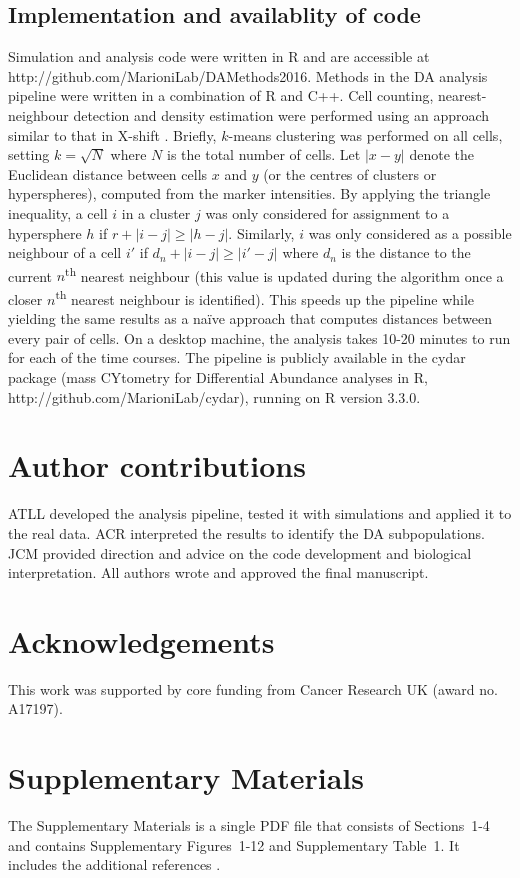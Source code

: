 \documentclass{article}
\newcommand{\suppannotate}{4}
\newcommand{\suppfigclusterreal}{12}
\begin{document}
\subsection{Implementation and availablity of code}
Simulation and analysis code were written in R and are accessible at {http://\-github.com/\-MarioniLab/\-DAMethods2016}.
Methods in the DA analysis pipeline were written in a combination of R and C++.
Cell counting, nearest-neighbour detection and density estimation were performed using an approach similar to that in X-shift \cite{samusik2016automated}.
Briefly, $k$-means clustering was performed on all cells, setting $k=\sqrt{N}$ where $N$ is the total number of cells.
Let $|x-y|$ denote the Euclidean distance between cells $x$ and $y$ (or the centres of clusters or hyperspheres), computed from the marker intensities.
By applying the triangle inequality, a cell $i$ in a cluster $j$ was only considered for assignment to a hypersphere $h$ if $r + |i-j| \ge |h-j|$.
Similarly, $i$ was only considered as a possible neighbour of a cell $i'$ if $d_n + |i-j| \ge |i'-j|$ where $d_n$ is the distance to the current $n$\textsuperscript{th} nearest neighbour (this value is updated during the algorithm once a closer $n$\textsuperscript{th} nearest neighbour is identified).
This speeds up the pipeline while yielding the same results as a na\"ive approach that computes distances between every pair of cells.
On a desktop machine, the analysis takes 10-20 minutes to run for each of the time courses.
The pipeline is publicly available in the cydar package (mass CYtometry for Differential Abundance analyses in R, http://\-github.com/\-MarioniLab/\-cydar), running on R version 3.3.0. 

\section{Author contributions}
ATLL developed the analysis pipeline, tested it with simulations and applied it to the real data. 
ACR interpreted the results to identify the DA subpopulations.
JCM provided direction and advice on the code development and biological interpretation.
All authors wrote and approved the final manuscript.

\section{Acknowledgements}
This work was supported by core funding from Cancer Research UK (award no. A17197).

\section{Supplementary Materials}
The Supplementary Materials is a single PDF file that consists of Sections~1-\suppannotate{} and contains Supplementary Figures~1-\suppfigclusterreal{} and Supplementary Table~1.
It includes the additional references \cite{gaudilliere2014delayed,gaudilliere2015implementing,lun2016delicious,benjamini1997multiple,robinson2010scaling,mccarthy2009treat}.



\end{document}
